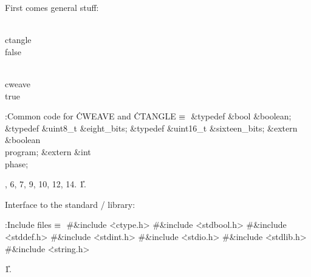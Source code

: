 



First comes general stuff:



\Y\B\4\D\\{ctangle}\5
\\{false}\par
\B\4\D\\{cweave}\5
\\{true}\par
\Y\B\4:Common code for \.{CWEAVE} and \.{CTANGLE}\X${}\equiv{}$\6
\&{typedef} \&{bool} \&{boolean};\6
\&{typedef} \&{uint8\_t} \&{eight\_bits};\6
\&{typedef} \&{uint16\_t} \&{sixteen\_bits};\6
\&{extern} \&{boolean} \\{program};\6
\&{extern} \&{int} \\{phase};\par
{}, 6, 7, 9, 10, 12, 14.
\U1.\fi

Interface to the standard \CEE/ library:

\Y\B\4:Include files\X${}\equiv{}$\6
\8\#\&{include} \.{<ctype.h>}\6
\8\#\&{include} \.{<stdbool.h>}\6
\8\#\&{include} \.{<stddef.h>}\6
\8\#\&{include} \.{<stdint.h>}\6
\8\#\&{include} \.{<stdio.h>}\6
\8\#\&{include} \.{<stdlib.h>}\6
\8\#\&{include} \.{<string.h>}\par
\U1.\fi

